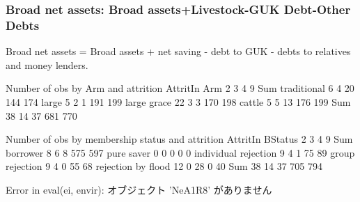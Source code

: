 

\subsubsection{Broad net assets: Broad assets+Livestock-GUK Debt-Other Debts}

Broad net assets = Broad assets + net saving - debt to GUK - debts to relatives and money lenders.

\begin{Schunk}
\begin{Soutput}


Number of obs by Arm and attrition
             AttritIn
Arm             2   3   4   9 Sum
  traditional   6   4  20 144 174
  large         5   2   1 191 199
  large grace  22   3   3 170 198
  cattle        5   5  13 176 199
  Sum          38  14  37 681 770


Number of obs by membership status and attrition
                      AttritIn
BStatus                  2   3   4   9 Sum
  borrower               8   6   8 575 597
  pure saver             0   0   0   0   0
  individual rejection   9   4   1  75  89
  group rejection        9   4   0  55  68
  rejection by flood    12   0  28   0  40
  Sum                   38  14  37 705 794
\end{Soutput}
\begin{Soutput}
Error in eval(ei, envir):  オブジェクト 'NeA1R8' がありません 
\end{Soutput}
\end{Schunk}




